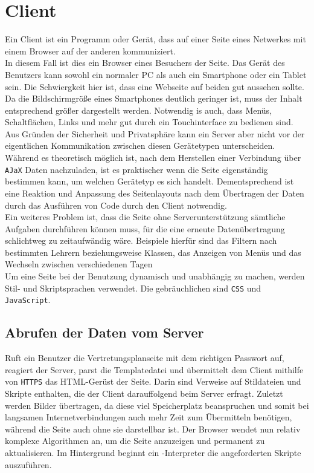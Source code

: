 \section{Client}
Ein Client ist ein Programm oder Gerät, dass auf einer Seite eines Netwerkes mit einem Browser auf der anderen kommuniziert.\\
 In diesem Fall ist dies ein Browser eines Besuchers der Seite. Das Gerät des Benutzers kann sowohl ein normaler PC als auch ein Smartphone oder ein Tablet sein. Die Schwiergkeit hier ist, dass eine Webseite auf beiden gut aussehen sollte. Da die Bildschirmgröße eines Smartphones deutlich geringer ist, muss der Inhalt entsprechend größer dargestellt werden. Notwendig is auch, dass Menüs, Schaltflächen, Links und mehr gut durch ein Touchinterface zu bedienen sind. Aus Gründen der Sicherheit und Privatsphäre kann ein Server aber nicht vor der eigentlichen Kommunikation zwischen diesen Gerätetypen unterscheiden. Während es theoretisch möglich ist, nach dem Herstellen einer Verbindung über \texttt{AJaX} Daten nachzuladen, ist es praktischer wenn die Seite eigenständig bestimmen kann, um welchen Gerätetyp es sich handelt. Dementsprechend ist eine Reaktion und Anpassung des Seitenlayouts nach dem Übertragen der Daten durch das Ausführen von Code durch den Client notwendig.\\

Ein weiteres Problem ist, dass die Seite ohne Serverunterstützung sämtliche Aufgaben durchführen können muss, für die eine erneute Datenübertragung schlichtweg zu zeitaufwändig wäre. Beispiele hierfür sind das Filtern nach bestimmten Lehrern beziehungsweise Klassen, das Anzeigen von Menüs und das Wechseln zwischen verschiedenen Tagen\\

Um eine Seite bei der Benutzung dynamisch und unabhängig zu machen, werden Stil- und Skriptsprachen verwendet. Die gebräuchlichen sind \texttt{CSS} und \texttt{JavaScript}.

\subsection{Abrufen der Daten vom Server}
Ruft ein Benutzer die Vertretungsplanseite mit dem richtigen Passwort auf, reagiert der Server, parst die Templatedatei und übermittelt dem Client mithilfe von \texttt{HTTPS} das HTML-Gerüst der Seite. Darin sind Verweise auf Stildateien und Skripte enthalten, die der Client darauffolgend beim Server erfragt. Zuletzt werden Bilder übertragen, da diese viel Speicherplatz beanspruchen und somit bei langsamen Internetverbindungen auch mehr Zeit zum Übermitteln benötigen, während die Seite auch ohne sie darstellbar ist. Der Browser wendet nun relativ komplexe Algorithmen an, um die Seite anzuzeigen und permanent zu aktualisieren. Im Hintergrund beginnt ein \JavaScript-Interpreter die angeforderten Skripte auszuführen.
